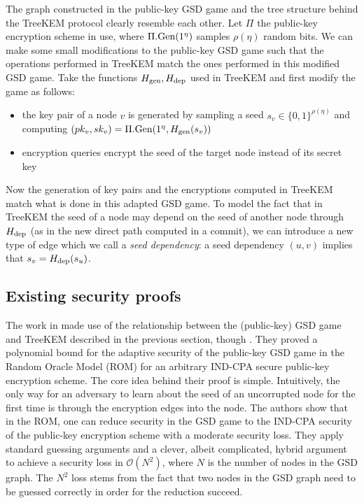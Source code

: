 The graph constructed in the public-key GSD game and the tree structure behind the TreeKEM protocol clearly resemble each other. Let $\Pi$ the public-key encryption scheme in use, where $\Pi.\mathrm{Gen}(1^\eta)$ samples $\rho(\eta)$ random bits. We can make some small modifications to the public-key GSD game such that the operations performed in TreeKEM match the ones performed in this modified GSD game. Take the functions $H_\mathrm{gen}, H_\mathrm{dep}$ used in TreeKEM and first modify the game as follows:
\begin{itemize}
	\item the key pair of a node $v$ is generated by sampling a seed $s_v \in \{0, 1\}^{\rho(\eta)}$ and computing $(pk_v, sk_v) = \Pi.\mathrm{Gen}(1^\eta, H_\mathrm{gen}(s_v))$
	\item encryption queries encrypt the seed of the target node instead of its secret key
\end{itemize}
Now the generation of key pairs and the encryptions computed in TreeKEM match what is done in this adapted GSD game. To model the fact that in TreeKEM the seed of a node may depend on the seed of another node through $H_\mathrm{dep}$ (as in the new direct path computed in a commit), we can introduce a new type of edge which we call a \emph{seed dependency}: a seed dependency $(u, v)$ implies that $s_v = H_\mathrm{dep}(s_u)$.

\subsection{Existing security proofs}

The work in \cite{ttkem} made use of the relationship between the (public-key) GSD game and TreeKEM described in the previous section, though . They proved a polynomial bound for the adaptive security of the public-key GSD game in the Random Oracle Model (ROM) \cite{rom} for an arbitrary IND-CPA secure public-key encryption scheme. The core idea behind their proof is simple. Intuitively, the only way for an adversary to learn about the seed of an uncorrupted node for the first time is through the encryption edges into the node. The authors show that in the ROM, one can reduce security in the GSD game to the IND-CPA security of the public-key encryption scheme with a moderate security loss. They apply standard guessing arguments and a clever, albeit complicated, hybrid argument to achieve a security loss in $\mathcal{O}(N^2)$, where $N$ is the number of nodes in the GSD graph. The $N^2$ loss stems from the fact that two nodes in the GSD graph need to be guessed correctly in order for the reduction succeed.

